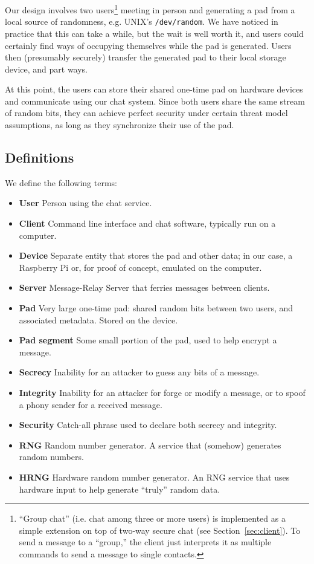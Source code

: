 \documentclass[twocolumn]{article}
\begin{document}
Our design involves two users\footnote{
``Group chat'' (i.e. chat among three or more users) is implemented as a simple extension on top of two-way secure chat (see Section~\ref{sec:client}). To send a message to a ``group,'' the client just interprets it as multiple commands to send a message to single contacts.
}
meeting in person and generating a pad from a local source of randomness, e.g. UNIX's \texttt{/dev/random}. We have noticed in practice that this can take a while, but the wait is well worth it, and users could certainly find ways of occupying themselves while the pad is generated. Users then (presumably securely) transfer the generated pad to their local storage device, and part ways.

At this point, the users can store their shared one-time pad on hardware devices and communicate using our chat system. Since both users share the same stream of random bits, they can achieve perfect security under certain threat model assumptions, as long as they synchronize their use of the pad.

\subsection{Definitions}
We define the following terms:
\begin{itemize} \itemsep0em 
  \item \textbf{User} Person using the chat service.
  \item \textbf{Client} Command line interface and chat software, typically run on a computer.
  \item \textbf{Device} Separate entity that stores the pad and other data; in our case, a Raspberry Pi or, for proof of concept, emulated on the computer.
  \item \textbf{Server} Message-Relay Server that ferries messages between clients.
  \item \textbf{Pad} Very large one-time pad: shared random bits between two users, and associated metadata. Stored on the device.
  \item \textbf{Pad segment} Some small portion of the pad, used to help encrypt a message.
  \item \textbf{Secrecy} Inability for an attacker to guess any bits of a message.
  \item \textbf{Integrity} Inability for an attacker for forge or modify a message, or to spoof a phony sender for a received message.
  \item \textbf{Security} Catch-all phrase used to declare both secrecy and integrity.
  \item \textbf{RNG} Random number generator. A service that (somehow) generates random numbers.
  \item \textbf{HRNG} Hardware random number generator. An RNG service that uses hardware input to help generate ``truly'' random data.
\end{itemize}
\end{document}

